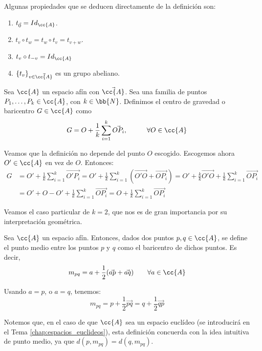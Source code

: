 Algunas propiedades que se deducen directamente de la definición son:
\begin{enumerate}
    \item $t_{\vec{0}}=Id_{\cc{A}}$.
    \item $t_v\circ t_w = t_w\circ t_v = t_{v+w}$.
    \item $t_v\circ t_{-v}=Id_{\cc{A}}$
    \item $\{t_v\}_{v\in \vec{\cc{A}}}$ es un grupo abeliano.
\end{enumerate}


\begin{definicion}
    Sea $\cc{A}$ un espacio afín con $\vec{\cc{A}}$. Sea una familia de puntos $P_1,\dots,P_k\in \cc{A}$, con $k\in \bb{N}$. Definimos el centro de gravedad o baricentro $G\in \cc{A}$ como
    $$G=O+\frac{1}{k}\sum_{i=1}^k \vec{OP_i}, \hspace{1cm} \forall O\in \cc{A}$$
\end{definicion}

Veamos que la definición no depende del punto $O$ escogido. Escogemos ahora $O'\in \cc{A}$ en vez de $O$. Entonces:
\begin{equation*}\begin{split}
    G&=O'+\frac{1}{k}\sum_{i=1}^k \vec{O'P_i}
    =O'+\frac{1}{k}\sum_{i=1}^k (\vec{O'O} + \vec{OP_i})
    = O' + \frac{k}{k}\vec{O'O} + \frac{1}{k}\sum_{i=1}^k \vec{OP_i}\\
    &= O' + O-O' + \frac{1}{k}\sum_{i=1}^k \vec{OP_i}
    = O+\frac{1}{k}\sum_{i=1}^k \vec{OP_i}
\end{split}\end{equation*}

Veamos el caso particular de $k=2$, que nos es de gran importancia por su interpretación geométrica.
\begin{definicion}\label{def:PuntoMedio} Sea $\cc{A}$ un espacio afín. Entonces, dados dos puntos $p,q\in \cc{A}$, se define el punto medio entre los puntos $p$ y $q$ como el baricentro de dichos puntos. Es decir,
    \begin{equation*}
        m_{pq} = a + \frac{1}{2}(\vec{ap} + \vec{aq}) \qquad \forall a\in \cc{A}
    \end{equation*}

    Usando $a=p$, o $a=q$, tenemos:
    \begin{equation*}
        m_{pq} = p+\frac{1}{2}\vec{pq} = q + \frac{1}{2}\vec{qp}
    \end{equation*}
\end{definicion}
Notemos que, en el caso de que $\cc{A}$ sea un espacio euclídeo (se introducirá en el Tema \ref{chap:espacios_euclideos}), esta definición concuerda con la idea intuitiva de punto medio, ya que $d(p,m_{pq})=d(q,m_{pq})$.

